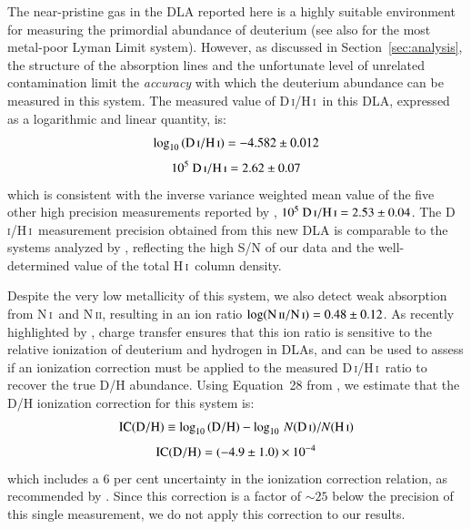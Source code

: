 \documentclass[12pt,preprint,useAMS,usenatbib]{emulateapj}
\newcommand{\DI}{\textrm{D}\,\textsc{i}}
\newcommand{\HI}{\textrm{H}\,\textsc{i}}
\newcommand{\NI}{N\,\textsc{i}}
\newcommand{\NII}{N\,\textsc{ii}}
\begin{document}
The near-pristine gas in the DLA reported here is a highly suitable environment for measuring the primordial abundance
of deuterium (see also \citealt{FumOmePro11} for the most metal-poor Lyman Limit system).
However, as discussed in Section~\ref{sec:analysis}, the structure of the absorption lines
and the unfortunate level of unrelated contamination limit the \textit{accuracy} with which
the deuterium abundance can be measured in this system.
The measured value of \DI/\HI\ in this DLA,
expressed as a logarithmic and linear quantity, is:
\begin{equation}
\log_{10}\,({\rm D\,\textsc{i}/H\,\textsc{i}}) = -4.582\pm0.012
\end{equation}
\begin{equation}
10^{5}~{\rm D\,\textsc{i}/H\,\textsc{i}} = 2.62\pm0.07
\end{equation}
which is consistent with the inverse variance weighted mean value of the five other
high precision measurements reported by \citet{Coo14},
$10^{5}~{\rm D\,\textsc{i}/H\,\textsc{i}} = 2.53\pm0.04$. The \DI/\HI\ measurement
precision obtained from this new DLA is comparable to the systems analyzed by
\citet{Coo14}, reflecting the high S/N of our data and the well-determined value
of the total \HI\ column density.



Despite the very low metallicity of this system, we also detect weak absorption
from \NI\ and \NII, resulting in an ion ratio $\log({\rm N\,\textsc{ii}/N\,\textsc{i}})=0.48\pm0.12$.
As recently highlighted by \citet{CooPet16}, charge transfer ensures that this ion ratio is
sensitive to the relative ionization of deuterium and hydrogen in DLAs, and can be used
to assess if an ionization correction must be applied to the measured \DI/\HI\ ratio to recover
the true D/H abundance. Using Equation~28 from \citet{CooPet16}, we estimate that the D/H
ionization correction for this system is:
\begin{equation}
{\rm IC(D/H)}\equiv\log_{10}{\rm (D/H)} - \log_{10}\,N({\rm D\,\textsc{i}})/N({\rm H\,\textsc{i}})
\end{equation}
\begin{equation}
{\rm IC(D/H)}=(-4.9\pm1.0)\times10^{-4}
\end{equation}
which includes a 6 per cent uncertainty in the ionization correction relation,
as recommended by \citet{CooPet16}. Since this correction is a factor of
$\sim25$ below the precision of this single measurement, we do not
apply this correction to our results.
\end{document}

